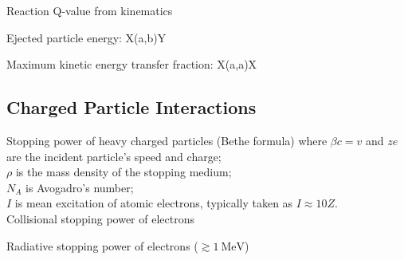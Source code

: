\noindent
Reaction Q-value from kinematics 

\noindent
Ejected particle energy: X(a,b)Y 

\noindent
Maximum kinetic energy transfer fraction: X(a,a)X~~\cite{authors}

\subsection{Charged Particle Interactions}

Stopping power of heavy charged particles (Bethe formula) 
\indent where $\beta c=v$ and $ze$ are the incident particle's speed and charge; \\
\indent $\rho$ is the mass density of the stopping medium;\\
\indent $N_A$ is Avogadro's number;\\
\indent $I$ is mean excitation of atomic electrons, typically taken as $I\approx10Z$.\\

\noindent
Collisional stopping power of electrons 

\noindent
Radiative stopping power of electrons ($\gtrsim1~\mathrm{MeV}$) 

